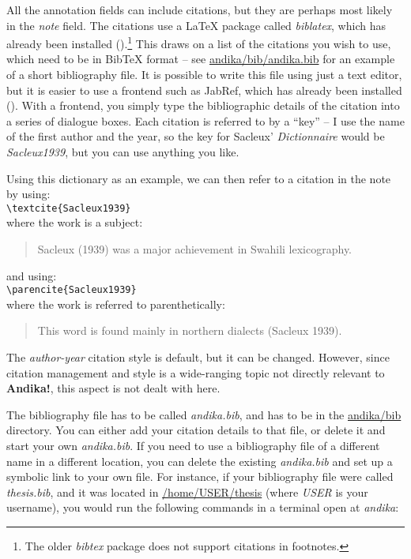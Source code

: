 All the annotation fields can include citations, but they are perhaps most likely in the \textit{note} field.  The citations use a LaTeX package called \textit{biblatex}, which has already been installed ().\footnote{The older \textit{bibtex} package does not support citations in footnotes.}  This draws on a list of the citations you wish to use, which need to be in BibTeX format -- see \url{andika/bib/andika.bib} for an example of a short bibliography file.  It is possible to write this file using just a text editor, but it is easier to use a frontend such as JabRef, which has already been installed ().  With a frontend, you simply type the bibliographic details of the citation into a series of dialogue boxes.  Each citation is referred to by a ``key'' -- I use the name of the first author and the year, so the key for Sacleux' \textit{Dictionnaire} would be \textit{Sacleux1939}, but you can use anything you like.

Using this dictionary as an example, we can then refer to a citation in the note by using:\\
\verb|\textcite{Sacleux1939}|\\
where the work is a subject:
\begin{quotation}
Sacleux (1939) was a major achievement in Swahili lexicography.
\end{quotation}
and using:\\
\verb|\parencite{Sacleux1939}| \\
where the work is referred to parenthetically:
\begin{quotation}
This word is found mainly in northern dialects (Sacleux 1939).
\end{quotation}

The \textit{author-year} citation style is default, but it can be changed.  However, since citation management and style is a wide-ranging topic not directly relevant to \textbf{Andika!}, this aspect is not dealt with here.

The bibliography file has to be called \textit{andika.bib}, and has to be in the \url{andika/bib} directory.  You can either add your citation details to that file, or delete it and start your own \textit{andika.bib}.  If you need to use a bibliography file of a different name in a different location, you can delete the existing \textit{andika.bib} and set up a symbolic link to your own file.  For instance, if your bibliography file were called \textit{thesis.bib}, and it was located in \url{/home/USER/thesis} (where \textit{USER} is your username), you would run the following commands in a terminal open at \textit{andika}:


